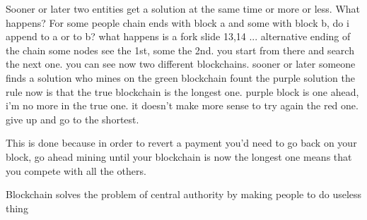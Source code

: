                     Sooner or later two entities get a solution at the same time or more or less. What happens?
                    For some people chain ends with block a and some with block b, do i append to a or to b?
                        what happens is a fork
                        slide 13,14 ...  
                            alternative ending of the chain
                            some nodes see the 1st, some the 2nd.
                            you start from there and search the next one.
                            you can see now two different blockchains.
                            sooner or later someone finds a solution
                                who mines on the green blockchain fount the purple solution
                                    the rule now is that the true blockchain is the longest one.
                                        purple block is one ahead, i'm no more in the true one. 
                                        it doesn't make more sense to try again the red one.
                                        give up and go to the shortest.
                                    
                            This is done because in order to revert a payment you'd need to go back on your block, go ahead mining until your blockchain is now the longest one
                            means that you compete with all the others.

                            Blockchain solves the problem of central authority by making people to do useless thing 





\fi